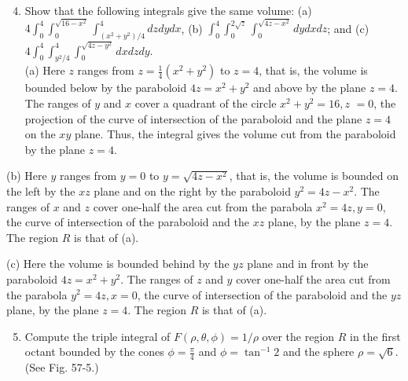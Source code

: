 \documentclass[10pt]{article}
\begin{document}
\begin{enumerate}
  \setcounter{enumi}{3}
  \item Show that the following integrals give the same volume: (a) $4 \int_{0}^{4} \int_{0}^{\sqrt{16-x^{2}}} \int_{\left(x^{2}+y^{2}\right) / 4}^{4} d z d y d x$, (b) $\int_{0}^{4} \int_{0}^{2 \sqrt{z}} \int_{0}^{\sqrt{4 z-x^{2}}} d y d x d z$; and (c) $4 \int_{0}^{4} \int_{y^{2} / 4}^{4} \int_{0}^{\sqrt{4 z-y^{2}}} d x d z d y$.\\
(a) Here $z$ ranges from $z=\frac{1}{4}\left(x^{2}+y^{2}\right)$ to $z=4$, that is, the volume is bounded below by the paraboloid $4 z=x^{2}+y^{2}$ and above by the plane $z=4$. The ranges of $y$ and $x$ cover a quadrant of the circle $x^{2}+y^{2}=16, z$ $=0$, the projection of the curve of intersection of the paraboloid and the plane $z=4$ on the $x y$ plane. Thus, the integral gives the volume cut from the paraboloid by the plane $z=4$.
\end{enumerate}

(b) Here $y$ ranges from $y=0$ to $y=\sqrt{4 z-x^{2}}$, that is, the volume is bounded on the left by the $x z$ plane and on the right by the paraboloid $y^{2}=4 z-x^{2}$. The ranges of $x$ and $z$ cover one-half the area cut from the parabola $x^{2}=4 z, y=0$, the curve of intersection of the paraboloid and the $x z$ plane, by the plane $z=4$. The region $R$ is that of (a).

(c) Here the volume is bounded behind by the $y z$ plane and in front by the paraboloid $4 z=x^{2}+y^{2}$. The ranges of $z$ and $y$ cover one-half the area cut from the parabola $y^{2}=4 z, x=0$, the curve of intersection of the paraboloid and the $y z$ plane, by the plane $z=4$. The region $R$ is that of (a).

\begin{enumerate}
  \setcounter{enumi}{4}
  \item Compute the triple integral of $F(\rho, \theta, \phi)=1 / \rho$ over the region $R$ in the first octant bounded by the cones $\phi=\frac{\pi}{4}$ and $\phi=\tan ^{-1} 2$ and the sphere $\rho=\sqrt{6}$. (See Fig. 57-5.)
\end{enumerate}
\end{document}
